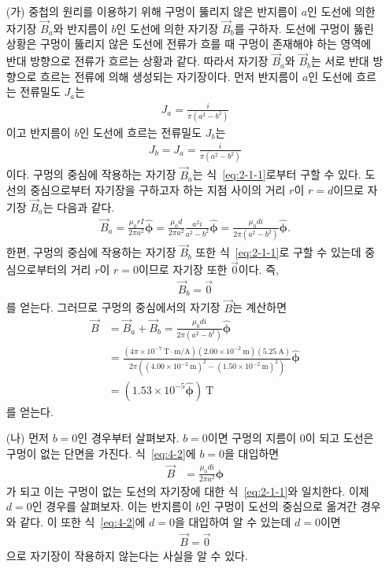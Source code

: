 \documentclass[tightenlines,floatfix,nofootinbib,superscriptaddress,fleqn]{revtex4}
\begin{document}
\vspace{1cm}
\begin{itemize}
  \item[(가)]
  중첩의 원리를 이용하기 위해 구멍이 뚫리지 않은 반지름이 $a$인 도선에 의한 자기장 
  $\vec{B}_a$와 반지름이 $b$인 도선에 의한 자기장 $\vec{B}_b$를 구하자. 도선에 구멍이 뚫린 
  상황은 구멍이 뚫리지 않은 도선에 전류가 흐를 때 구멍이 존재해야 하는 영역에 반대 방향으로 
  전류가 흐르는 상황과 같다. 따라서 자기장 $\vec{B}_a$와 $\vec{B}_b$는 서로 반대 방향으로 
  흐르는 전류에 의해 생성되는 자기장이다. 먼저 반지름이 $a$인 도선에 흐르는 전류밀도 $J_a$는
  \begin{align}
    J_a = \frac{i}{\pi (a^2-b^2)}
  \end{align}
  이고 반지름이 $b$인 도선에 흐르는 전류밀도 $J_b$는
  \begin{align}
    J_b = J_a = \frac{i}{\pi (a^2-b^2)}
  \end{align}
  이다. 구멍의 중심에 작용하는 자기장 $\vec{B}_a$는 식~\eqref{eq:2-1-1}로부터 구할 수 있다.
  도선의 중심으로부터 자기장을 구하고자 하는 지점 사이의 거리 $r$이 $r=d$이므로 자기장 
  $\vec{B}_a$는 다음과 같다.
  \begin{align}
    \vec{B}_a = \frac{\mu_0rI}{2\pi a^2}\hat{\bm \phi}
    =\frac{\mu_0d}{2\pi a^2}\frac{a^2i}{a^2-b^2}\hat{\bm \phi}
    =\frac{\mu_0d i}{2\pi(a^2-b^2)}\hat{\bm \phi}.
  \end{align}
  한편, 구멍의 중심에 작용하는 자기장 $\vec{B}_b$ 또한 식~\eqref{eq:2-1-1}로 구할 수 있는데
  중심으로부터의 거리 $r$이 $r=0$이므로 자기장 또한 $\vec{0}$이다. 즉,
  \begin{align}
    \vec{B}_b = \vec{0}
  \end{align}
  를 얻는다. 그러므로 구멍의 중심에서의 자기장 $\vec{B}$는 계산하면
  \begin{align}
      \label{eq:4-2}\vec{B} &= \vec{B}_a + \vec{B}_b 
      = \frac{\mu_0d i}{2\pi(a^2-b^2)}\hat{\bm \phi} \\
      &=\frac{(4\pi\times 10^{-7}~\mathrm{T\cdot m/A})(2.00\times 10^{-2}~\mathrm{m})
      (5.25~\mathrm{A})}
      {2\pi((4.00\times 10^{-2}~\mathrm{m})^2-(1.50\times 10^{-2}~\mathrm{m})^2)}
      \hat{\bm \phi} \\
      &=(1.53\times 10^{-5}\hat{\bm \phi})~\mathrm{T}
  \end{align}
  를 얻는다.
  \item[(나)] 먼저 $b=0$인 경우부터 살펴보자. $b=0$이면 구멍의 지름이 $0$이 되고 도선은
  구멍이 없는 단면을 가진다. 식~\eqref{eq:4-2}에 $b=0$을 대입하면
  \begin{align}
    \vec{B} &= \frac{\mu_0d i}{2\pi a^2}\hat{\bm \phi}
  \end{align}
가 되고 이는 구멍이 없는 도선의 자기장에 대한 식~\eqref{eq:2-1-1}와 일치한다. 이제
$d=0$인 경우를 살펴보자. 이는 반지름이 $b$인 구멍이 도선의 중심으로 옮겨간 경우와 같다.
이 또한 식~\eqref{eq:4-2}에 $d=0$을 대입하여 알 수 있는데 $d=0$이면
\begin{align}
  \vec{B} = \vec{0}
\end{align}
으로 자기장이 작용하지 않는다는 사실을 알 수 있다.
\end{itemize}
\end{document}
